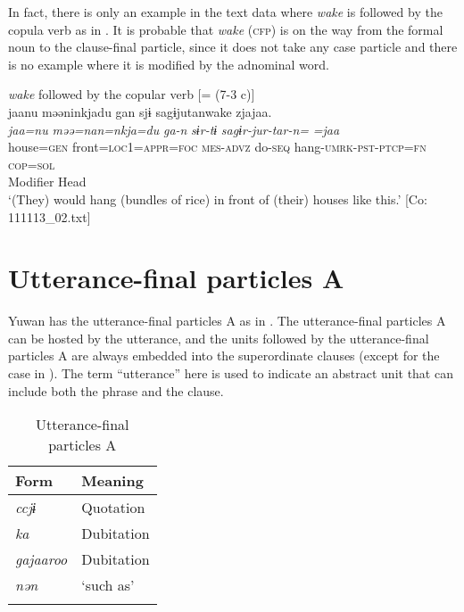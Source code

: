 In fact, there is only an example in the text data where \textit{wake} is followed by the copula verb as in . It is probable that \textit{wake} (\textsc{cfp}) is on the way from the formal noun to the clause-final particle, since it does not take any case particle and there is no example where it is modified by the adnominal word.

\ea\label{ex:10.58}   \textit{wake} followed by the copular verb [= (7-3 c)]\\
      \gllll    jaanu  məəninkjadu  gan  sjɨ   sagɨjutanwake  zjajaa.\\
    \textit{jaa=nu}  \textit{məə=nan=nkja=du}  \textit{ga-n}  \textit{sɨr-tɨ} \textit{sagɨr-jur-tar-n=}  \textit{=jaa}\\
    house=\textsc{gen}  front=\textsc{loc}1=\textsc{appr}=\textsc{foc}  \textsc{mes}-\textsc{advz}  do-\textsc{seq}  hang-\textsc{umrk}-\textsc{pst}-\textsc{ptcp}=\textsc{fn}  \textsc{cop}=\textsc{sol}\\
    Modifier  Head\\
    \glt  ‘(They) would hang (bundles of rice) in front of (their) houses like this.’ [Co: 111113\_02.txt]
\z

\section{Utterance-final particles A}\label{sec:10.4}

Yuwan has the utterance-final particles A as in . The utterance-final particles A can be hosted by the utterance, and the units followed by the utterance-final particles A are always embedded into the superordinate clauses (except for the case in ). The term “utterance” here is used to indicate an abstract unit that can include both the phrase and the clause.

\begin{table}
\caption{Utterance-final particles A\label{tab:100}}
\begin{tabular}{ll}
\lsptoprule
Form & Meaning\\\midrule
\textit{ccjɨ}     & Quotation \\
\textit{ka}       & Dubitation\\
\textit{gajaaroo} & Dubitation\\
\textit{nən}      & ‘such as’ \\
\lspbottomrule
\end{tabular}
\end{table}

